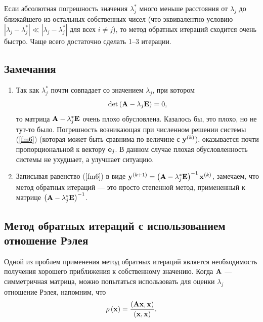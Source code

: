 \documentclass[12pt]{article}
\begin{document}
	Если абсолютная погрешность значения $\lambda_j^{*}$ много меньше расстояния от $\lambda_j$ до ближайшего из остальных собственных чисел (что эквивалентно условию $\left|\lambda_j-\lambda_j^{*}\right|\ll \left|\lambda_j-\lambda_j^{*}\right|$ для всех $i\neq j$), то метод обратных итераций сходится очень быстро. Чаще всего достаточно сделать 1--3 итерации.
	
	\subsection*{Замечания}
	
	\begin{enumerate}
		\item Так как $\lambda_j^{*}$ почти совпадает со значением $\lambda_j$, при котором \begin{equation}\det\left(\bold{A}-\lambda_j\bold{E}\right)=0,\end{equation} то матрица $\bold{A}-\lambda_j^{*}\bold{E}$ очень плохо обусловлена. Казалось бы, это плохо, но не тут-то было. Погрешность возникающая при численном решении системы (\ref{fm6}) (которая может быть сравнима по величине с $\bold{y}^{\left(k\right)}$), оказывается почти пропорциональной к вектору $\bold{e}_j$. В данном случае плохая обусловленность системы не ухудшает, а улучшает ситуацию.
		\item Записывая равенство (\ref{fm6}) в виде $\bold{y}^{\left(k+1\right)}=\left(\bold{A}-\lambda_j^{*}\bold{E}\right)^{-1}\bold{x}^{\left(k\right)}$, замечаем, что метод обратных итераций --- это просто степенной метод, примененный к матрице $\left(\bold{A}-\lambda_j^{*}\bold{E}\right)^{-1}$.
	\end{enumerate}
	
	\subsection*{Метод обратных итераций с использованием отношение Рэлея}
	
	Одной из проблем применения метод обратных итераций является необходимость получения хорошего приближения к собственному значению. Когда $\bold{A}$ --- симметричная матрица, можно попытаться использовать для оценки $\lambda_j$ отношение Рэлея, напомним, что
	\begin{equation}
		\rho\left(\bold{x}\right)=\frac{\left(\bold{Ax},\bold{x}\right)}{\left(\bold{x},\bold{x}\right)}.
	\end{equation}
	
\end{document}
